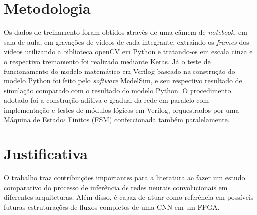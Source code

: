 \section{Metodologia}
Os dados de treinamento foram obtidos através de uma câmera de \textit{notebook}, em sala de aula, em gravações de vídeos de cada integrante, extraindo os \textit{frames} dos vídeos utilizando a biblioteca openCV em Python e tratando-os em escala cinza e o respectivo treinamento foi realizado mediante Keras. Já o teste de funcionamento do modelo matemático em Verilog baseado na construção do modelo Python foi feito pelo \textit{software} ModelSim, e seu respectivo resultado de simulação comparado com o resultado do modelo Python.
O procedimento adotado foi a construção aditiva e gradual da rede em paralelo com implementação e testes de módulos lógicos em Verilog, orquestrados por uma Máquina de Estados Finitos (FSM) confeccionada também paralelamente.

\section{Justificativa}
O trabalho traz contribuições importantes para a literatura ao fazer um estudo comparativo do processo de inferência de redes neurais convolucionais em diferentes arquiteturas. Além disso, é capaz de atuar como referência em possíveis futuras estruturações de fluxos completos de uma CNN em um FPGA.
\nocite{Hoxha:2025:FAN}
\nocite{MADAOUI2023104927}